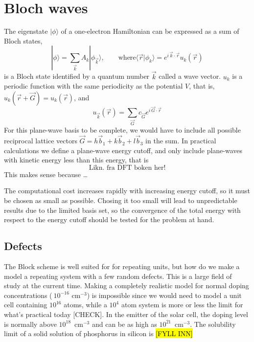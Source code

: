 \documentclass[11pt,bibliography=totoc,index=totoc]{scrbook}   %
\newcommand{\comment}[1]{\hl{#1}}
\begin{document}
\section{Bloch waves}

The eigenstate $|\phi\rangle$ of a one-electron Hamiltonian can be expressed 
as a sum of Bloch states,
\begin{equation}
  |\phi\rangle = \sum_{\vec{k}} A_k |\phi_{\vec{k}}\rangle,\qquad \text{where} 
  \langle\vec{r}|\phi_k\rangle = e^{i\,\vec{k}\cdot\vec{r}} u_k(\vec{r})
\end{equation}
is a Bloch state identified by a quantum number $\vec{k}$ called a wave vector.
$u_k$ is a periodic function with the same periodicity as
the potential $V$, that is, $u_k(\vec{r}+\vec{G}) = u_k(\vec{r})$, and
\begin{equation}
  u_{\vec{k}}(\vec{r}) = \sum_{\vec{G}} c_{\vec{G}} e^{i\,\vec{G}\cdot\vec{r}}
\end{equation}
For this plane-wave basis to be complete, we would have to include all possible
reciprocal lattice vectors $\vec{G} = h\vec{b}_1 + k\vec{b}_2 + l\vec{b}_3$ in
the sum. In practical calculations we define a plane-wave energy cutoff, and
only include plane-waves with kinetic energy less than this energy, that is
\begin{equation}
  \text{Likn. fra DFT boken her!}
\end{equation}
This makes sense because \ldots

The computational cost increases rapidly with increasing energy cutoff, so it
must be chosen as small as possible. Chosing it too small will lead to
unpredictable results due to the limited basis set, so the convergence of the 
total energy with respect to the energy cutoff should be tested for the 
problem at hand.

\subsection{Defects}

The Block scheme is well suited for for repeating units, but how do we make a
model a repeating system with a few random defects. This is a large field of
study at the current time.
Making a completely realistic model for normal doping 
concentrations ($~10^{-16}$ cm$^{-3}$) is impossible since we would need to 
model a unit cell containing $10^{16}$ atoms, while a $10^4$ atom system is more or
less the limit for what's practical today [CHECK]. In the emitter of the
solar cell, the doping level is normally above $10^{18}$~cm$^{-3}$ and can be
as high as $10^{21}$~cm$^{-3}$. The solubility limit of a solid solution of
phosphorus in silicon is \comment{[FYLL INN]}
\end{document}
